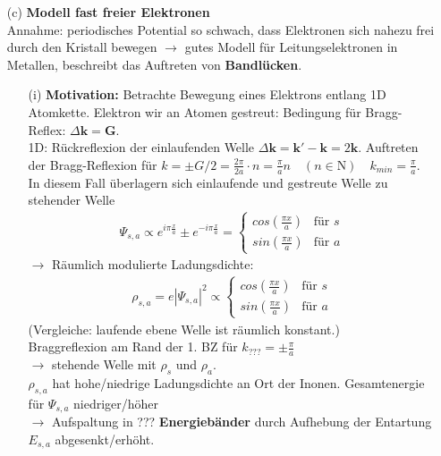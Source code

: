 \begin{itemize}
    \item[(c)] \textbf{Modell fast freier Elektronen} \\
    Annahme: periodisches Potential so schwach, dass Elektronen sich nahezu frei durch den Kristall bewegen $\rightarrow$ gutes Modell für Leitungselektronen in Metallen, beschreibt das Auftreten von \textbf{Bandlücken}.
    \begin{itemize}
        \item[(i)] \textbf{Motivation:} Betrachte Bewegung eines Elektrons entlang 1D Atomkette. Elektron wir an Atomen gestreut: Bedingung für Bragg-Reflex: $\Delta \textbf{k} = \textbf{G}$. \\
        1D: Rückreflexion der einlaufenden Welle $\Delta \textbf{k} =  \textbf{k}' -  \textbf{k} = 2 \textbf{k} $. Auftreten der Bragg-Reflexion für $k = \pm G/2 = \frac{2\pi}{2a}\cdot n = \frac{\pi}{a} n \quad (n \in \mathrm{N}) \quad k_{min} = \frac{\pi}{a}$. \\
        In diesem Fall überlagern sich einlaufende und gestreute Welle zu stehender Welle
        \begin{align}
            \Psi_{s,a} \propto e^{i\pi \frac{x}{a}} \pm e^{-i\pi \frac{x}{a}} = \begin{cases}
                cos(\frac{\pi x}{a}) & \text{für } s \\
                sin(\frac{\pi x}{a}) & \text{für } a 
            \end{cases}
        \end{align}
        $\rightarrow$ Räumlich modulierte Ladungsdichte:
        \begin{align}
            \rho_{s,a} = e \left|\Psi_{s,a}\right|^2 \propto \begin{cases}
                cos(\frac{\pi x}{a}) & \text{für } s \\
                sin(\frac{\pi x}{a}) & \text{für } a 
            \end{cases}
        \end{align}
        (Vergleiche: laufende ebene Welle ist räumlich konstant.)\\
        Braggreflexion am Rand der 1. BZ für $k_{???} = \pm \frac{\pi}{a}$\\
            $\rightarrow$ stehende Welle mit $\rho_s$ und $\rho_a$.\\
            $\rho_{s,a}$ hat hohe/niedrige Ladungsdichte an Ort der Inonen. Gesamtenergie für $\Psi_{s,a}$ niedriger/höher\\
            $\rightarrow$ Aufspaltung in ??? \textbf{Energiebänder} durch Aufhebung der Entartung $E_{s,a}$ abgesenkt/erhöht.  

\end{itemize}
\end{itemize}
